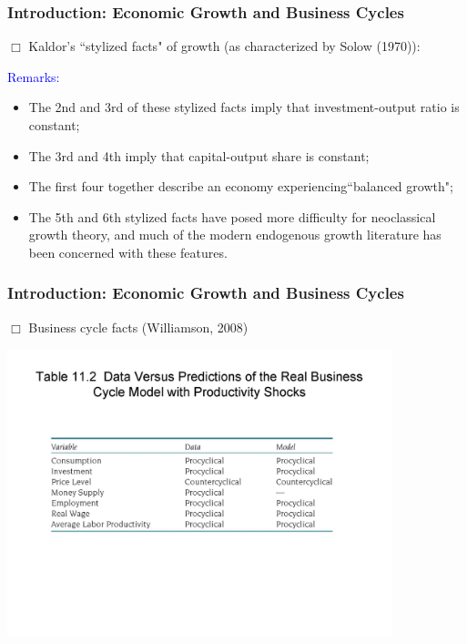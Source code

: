 \documentclass[handout]{beamer}
\begin{document}
\begin{frame}

\frametitle{Introduction: Economic Growth and Business Cycles}
\vskip 0.1in

$\Box$ Kaldor's ``stylized facts" of growth (as characterized by
Solow (1970)):\\\vskip 0.1in

\textcolor{blue}{Remarks:}

\begin{itemize}
\item The 2nd and 3rd of these stylized facts imply that
investment-output ratio is constant;
\item The 3rd and 4th imply that
capital-output share is constant;
\item The first four together describe an economy experiencing``balanced
growth";
\item The 5th and 6th stylized facts have posed more difficulty for
neoclassical growth theory, and much of the modern endogenous growth
literature has been concerned with these features.
\end{itemize}


\end{frame}




\begin{frame}

\frametitle{Introduction: Economic Growth and Business Cycles}
\vskip 0.1in


$\Box$ Business cycle facts (Williamson, 2008)

\includegraphics[width = 4.4in]{Tab11_2.jpg}


\end{frame}
\end{document}
